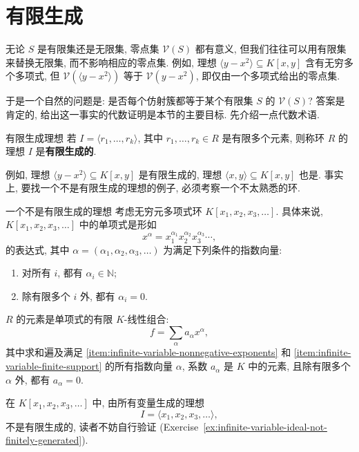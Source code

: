 \section{有限生成}\label{sec:finite-generation}

无论 $S$ 是有限集还是无限集, 零点集 $\mathcal{V}(S)$ 都有意义, 但我们往往可以用有限集来替换无限集, 而不影响相应的零点集. 例如, 理想 $\langle y-x^{2}\rangle\subseteq K[x,y]$ 含有无穷多个多项式, 但 $\mathcal{V}(\langle y-x^{2}\rangle)$ 等于 $\mathcal{V}(y-x^{2})$, 即仅由一个多项式给出的零点集.

于是一个自然的问题是: 是否每个仿射簇都等于某个有限集 $S$ 的 $\mathcal{V}(S)$? 答案是肯定的, 给出这一事实的代数证明是本节的主要目标. 先介绍一点代数术语.

\begin{Definition}{有限生成理想}\leavevmode\label{def:finitely-generated-ideal}
  若 $I=\langle r_{1},\ldots,r_{k}\rangle$, 其中 $r_{1},\ldots,r_{k}\in R$ 是有限多个元素, 则称环 $R$ 的理想 $I$ 是\textbf{有限生成的}.
\end{Definition}

例如, 理想 $\langle y-x^{2}\rangle\subseteq K[x,y]$ 是有限生成的, 理想 $\langle x,y\rangle\subseteq K[x,y]$ 也是. 事实上, 要找一个不是有限生成的理想的例子, 必须考察一个不太熟悉的环.

\begin{Example}{一个不是有限生成的理想}\leavevmode\label{ex:infinitely-generated-variable-ideal}
  考虑无穷元多项式环 $K[x_{1},x_{2},x_{3},\ldots]$. 具体来说, $K[x_{1},x_{2},x_{3},\ldots]$ 中的单项式是形如
  \[
    x^{\alpha}=x_{1}^{\alpha_{1}}x_{2}^{\alpha_{2}}x_{3}^{\alpha_{3}}\cdots,
  \]
  的表达式, 其中 $\alpha=(\alpha_{1},\alpha_{2},\alpha_{3},\ldots)$ 为满足下列条件的指数向量:
  \begin{enumerate}[label=(\roman*),ref=(\roman*)]
    \item\label{item:infinite-variable-nonnegative-exponents} 对所有 $i$, 都有 $\alpha_{i}\in\mathbb{N}$;
    \item\label{item:infinite-variable-finite-support} 除有限多个 $i$ 外, 都有 $\alpha_{i}=0$.
  \end{enumerate}
  $R$ 的元素是单项式的有限 $K$-线性组合:
  \[
    f=\sum_{\alpha}a_{\alpha}x^{\alpha},
  \]
  其中求和遍及满足 \ref{item:infinite-variable-nonnegative-exponents} 和 \ref{item:infinite-variable-finite-support} 的所有指数向量 $\alpha$, 系数 $a_{\alpha}$ 是 $K$ 中的元素, 且除有限多个 $\alpha$ 外, 都有 $a_{\alpha}=0$.

  在 $K[x_{1},x_{2},x_{3},\ldots]$ 中, 由所有变量生成的理想
  \[
    I=\langle x_{1},x_{2},x_{3},\ldots\rangle,
  \]
  不是有限生成的, 读者不妨自行验证 (Exercise~\ref{ex:infinite-variable-ideal-not-finitely-generated}).
\end{Example}

